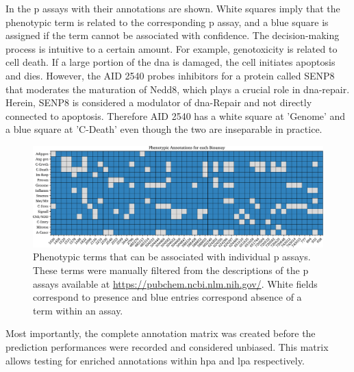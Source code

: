 In  the \acl{p} assays with their annotations are shown. White squares imply that the phenotypic term is related to the corresponding \acl{p} assay, and a blue square is assigned if the term cannot be associated with confidence. The decision-making process is intuitive to a certain amount. For example, genotoxicity is related to cell death. If a large portion of the \ac{dna} is damaged, the cell initiates apoptosis and dies. However, the AID 2540 probes inhibitors for a protein called SENP8 that moderates the maturation of Nedd8, which plays a crucial role in \ac{dna}-repair. Herein, SENP8 is considered a modulator of \ac{dna}-Repair and not directly connected to apoptosis. Therefore AID 2540 has a white square at 'Genome' and a blue square at 'C-Death' even though the two are inseparable in practice.
\begin{figure}[H]
	\centering
	\includegraphics[width=\textwidth]{figures/phenotypic_annotations_corr.pdf}
	\caption[Phenotypic Terms That Can be Associated with Individual \acl{p} Assays]{Phenotypic terms that can be associated with individual \acl{p} assays. These terms were manually filtered from the descriptions of the \acl{p} assays available at \url{https://pubchem.ncbi.nlm.nih.gov/}. White fields correspond to presence and blue entries correspond absence of a term within an assay.}
	\label{fig:phenotypicsparse}
\end{figure}\noindent
Most importantly, the complete annotation matrix was created before the prediction performances were recorded and considered unbiased. This matrix allows testing for enriched annotations within \acl{hpa} and \acl{lpa} respectively.

